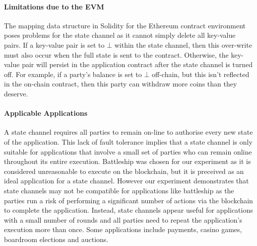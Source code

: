 \documentclass{llncs}
\begin{document}
\paragraph{Limitations due to the EVM} 
The mapping data structure in Solidity for the Ethereum contract environment poses problems for the state channel as it cannot simply delete all key-value pairs.
If a key-value pair is set to $\bot$ within the state channel, then this over-write must also occur when the full state is sent to the contract. 
Otherwise, the key-value pair will persist in the application contract after the state channel is turned off.
For example, if a party's balance is set to $\bot$ off-chain, but this isn't reflected in the on-chain contract, then this party can withdraw more coins than they deserve. 

\paragraph{Applicable Applications} 
A state channel requires all parties to remain on-line to authorise every new state of the application.
This lack of fault tolerance implies that a state channel is only suitable for applications that involve a small set of parties who can remain online throughout its entire execution.
Battleship was chosen for our experiment as it is considered unreasonable to execute on the blockchain, but it is preceived as an ideal application for a state channel.
However our experiment demonstrates that state channels may not be compatible for applications like battleship as the parties run a risk of performing a significant number of actions via the blockchain to complete the application. 
Instead, state channels appear useful for applications with a small number of rounds and all parties need to repeat the application's execution more than once. 
Some applications include payments, casino games, boardroom elections and auctions.
\end{document}
